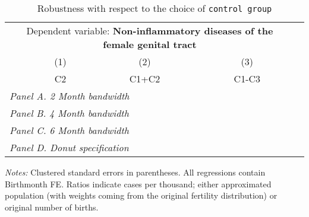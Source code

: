  \begin{table}[H] \begin{threeparttable} \centering \caption{Robustness with respect to the choice of \texttt{control group}} {\def\sym#1{\ifmmode^{#1}\else\(^{#1}\)\fi} \begin{tabular}{l*{4}{c}} \toprule \multicolumn{4}{c}{Dependent variable: \textbf{Non-inflammatory diseases of the female genital tract}} \\ \cmidrule(lr){2-4}
            &\multicolumn{1}{c}{(1)}&\multicolumn{1}{c}{(2)}&\multicolumn{1}{c}{(3)}\\
            &\multicolumn{1}{c}{C2}&\multicolumn{1}{c}{C1+C2}&\multicolumn{1}{c}{C1-C3}\\
\midrule
 \multicolumn{4}{l}{\emph{Panel A. 2 Month bandwidth}} \\    \midrule\multicolumn{4}{l}{\emph{Panel B. 4 Month bandwidth}} \\    \midrule\multicolumn{4}{l}{\emph{Panel C. 6 Month bandwidth}} \\    \midrule\multicolumn{4}{l}{\emph{Panel D. Donut specification}} \\    
\bottomrule \end{tabular} } \begin{tablenotes} \item \scriptsize \emph{Notes:} Clustered standard errors in parentheses. All regressions contain Birthmonth FE. Ratios indicate cases per thousand; either approximated population (with weights coming from the original fertility distribution) or original number of births. \end{tablenotes} \end{threeparttable} \end{table} 
